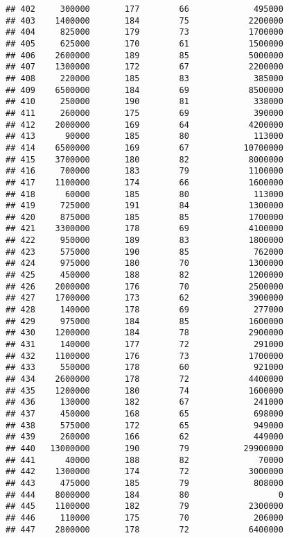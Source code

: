 \documentclass[
]{article}
\begin{document}
\begin{verbatim}
## 402     300000       177        66             495000
## 403    1400000       184        75            2200000
## 404     825000       179        73            1700000
## 405     625000       170        61            1500000
## 406    2600000       189        85            5000000
## 407    1300000       172        67            2200000
## 408     220000       185        83             385000
## 409    6500000       184        69            8500000
## 410     250000       190        81             338000
## 411     260000       175        69             390000
## 412    2000000       169        64            4200000
## 413      90000       185        80             113000
## 414    6500000       169        67           10700000
## 415    3700000       180        82            8000000
## 416     700000       183        79            1100000
## 417    1100000       174        66            1600000
## 418      60000       185        80             113000
## 419     725000       191        84            1300000
## 420     875000       185        85            1700000
## 421    3300000       178        69            4100000
## 422     950000       189        83            1800000
## 423     575000       190        85             762000
## 424     975000       180        70            1300000
## 425     450000       188        82            1200000
## 426    2000000       176        70            2500000
## 427    1700000       173        62            3900000
## 428     140000       178        69             277000
## 429     975000       184        85            1600000
## 430    1200000       184        78            2900000
## 431     140000       177        72             291000
## 432    1100000       176        73            1700000
## 433     550000       178        60             921000
## 434    2600000       178        72            4400000
## 435    1200000       180        74            1600000
## 436     130000       182        67             241000
## 437     450000       168        65             698000
## 438     575000       172        65             949000
## 439     260000       166        62             449000
## 440   13000000       190        79           29900000
## 441      40000       188        82              70000
## 442    1300000       174        72            3000000
## 443     475000       185        79             808000
## 444    8000000       184        80                  0
## 445    1100000       182        79            2300000
## 446     110000       175        70             206000
## 447    2800000       178        72            6400000

\end{verbatim}
\end{document}
